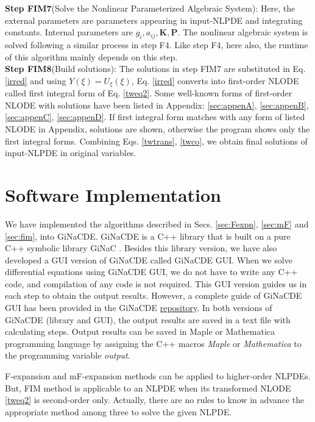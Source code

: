 \documentclass[prd,aps,floats,showkeys,nofootinbib,notitlepage]{revtex4}
\begin{document}
	
	\textbf{Step FIM7}(Solve the Nonlinear Parameterized Algebraic System): Here, the external parameters are parameters appearing in input-NLPDE and integrating constants. Internal parameters are $g_i,a_{ij},\boldsymbol{K},\boldsymbol{P}$. The nonlinear algebraic system is solved following a similar process in step F4. Like step F4, here also, the runtime of this algorithm mainly depends on this step.\\
	
	\textbf{Step FIM8}(Build solutions): The solutions in step FIM7 are substituted in Eq. \eqref{irred} and using $Y(\xi)=U_\xi(\xi)$, Eq. \eqref{irred} converts into first-order NLODE called first integral form of Eq. \eqref{tweq2}. Some well-known forms of first-order NLODE with solutions have been listed in Appendix: \ref{sec:appenA}, \ref{sec:appenB}, \ref{sec:appenC}, \ref{sec:appenD}. If first integral form matches with any form of listed NLODE in Appendix, solutions are shown, otherwise the program shows only the first integral forms. Combining Eqs. \eqref{twtrans}, \eqref{twco}, we obtain final solutions of input-NLPDE in original variables.\\
	
	
	\section{Software Implementation}\label{sec:imple}
	We have implemented the algorithms described in Secs. \ref{sec:Fexpn}, \ref{sec:mF} and \ref{sec:fim}, into GiNaCDE. GiNaCDE is a C++ library that is built on a pure C++ symbolic library GiNaC \cite{ginac}. Besides this library version, we have also developed a GUI version of GiNaCDE called GiNaCDE GUI. When we solve differential equations using GiNaCDE GUI, we do not have to write any C++ code, and compilation of any code is not required. This GUI version guides us in each step to obtain the output results. However, a complete guide of GiNaCDE GUI has been provided in the GiNaCDE \href{https://github.com/mithun218/GiNaCDE}{repository}. In both versions of GiNaCDE (library and GUI), the output results are saved in a text file with calculating steps. Output results can be saved in Maple or Mathematica programming language by assigning the C++ macros {\em Maple} or {\em Mathematica} to the programming variable {\em {output}}. 
	
	F-expansion and mF-expansion methods can be applied to higher-order NLPDEs. But, FIM method is applicable to an NLPDE when its transformed NLODE \eqref{tweq2} is second-order only. Actually, there are no rules to know in advance the appropriate method among three to solve the given NLPDE. 
	
\end{document}
